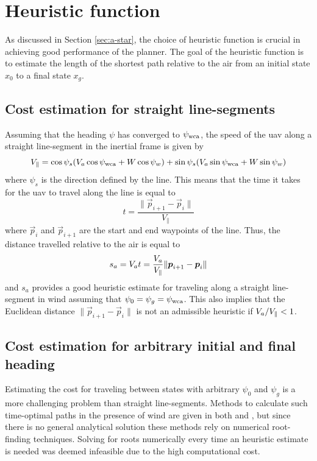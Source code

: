 \section{Heuristic function}
As discussed in Section \ref{sec:a-star}, the choice of heuristic function is 
crucial in achieving good performance of the planner. The goal of the heuristic function is to estimate the 
length of the shortest path relative to the air from an initial state $x_0$ to a final state $x_g$.

\subsection{Cost estimation for straight line-segments}\label{sec:straight_path_heuristic}
Assuming that the heading $\psi$ has converged to $\psi_{\text{wca}}$, the speed of the \ac{uav} 
along a straight line-segment in the inertial frame is given by 
\begin{equation}
    V_{\parallel}=\cos\psi_s(V_a\cos\psi_{\text{wca}}+W\cos\psi_w) + \sin\psi_s(V_a\sin\psi_{\text{wca}}+W\sin\psi_w)
\end{equation}
where $\psi_s$ is the direction defined by the line. This means that the time it takes for the \ac{uav} to travel along the line is equal to 
\begin{equation}
    t=\frac{\|\vec{p}_{i+1}-\vec{p}_i\|}{V_\parallel}
\end{equation}
where $\vec{p}_{i}$ and $\vec{p}_{i+1}$ are the start and end waypoints of the line. Thus, the distance 
travelled relative to the air is equal to 
\begin{equation}
    s_a=V_at=\frac{V_a}{V_\parallel}\|\boldsymbol{p}_{i+1}-\boldsymbol{p}_{i}\|
\end{equation}
and $s_a$ provides a good heuristic estimate for traveling along a straight line-segment in wind assuming that $\psi_0=\psi_g=\psi_{\text{wca}}$.
This also implies that the Euclidean distance $\|\vec{p}_{i+1}-\vec{p}_{i}\|$ is not an admissible heuristic if 
$V_a/V_\parallel<1$.

\subsection{Cost estimation for arbitrary initial and final heading}
Estimating the cost for traveling between states with arbitrary $\psi_0$ and $\psi_g$ is a more challenging problem than straight line-segments.
Methods to calculate such time-optimal paths in the presence of wind are given in both \cite{optimal_path_target} and \cite{optimal_path_trochoidal}, 
but since there is no general analytical solution these methods rely on numerical root-finding techniques.
Solving for roots numerically every time an heuristic estimate is needed was deemed infeasible due to the high computational cost.

